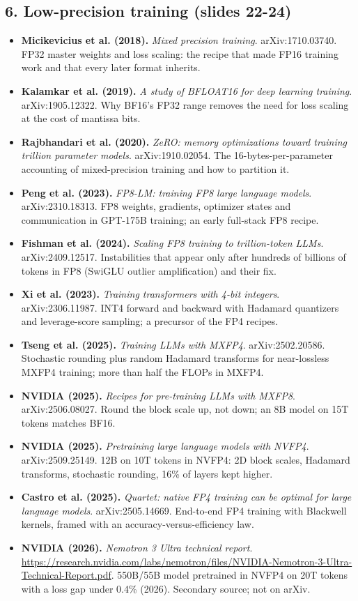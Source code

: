 \documentclass[11pt,letterpaper]{article}
\begin{document}
\subsection*{6. Low-precision training (slides 22-24)}
\begin{itemize}[leftmargin=1.2em,itemsep=3pt]\sloppy
\item \textbf{Micikevicius et al. (2018).} \textit{Mixed precision training}. arXiv:1710.03740. FP32 master weights and loss scaling: the recipe that made FP16 training work and that every later format inherits.
\item \textbf{Kalamkar et al. (2019).} \textit{A study of BFLOAT16 for deep learning training}. arXiv:1905.12322. Why BF16's FP32 range removes the need for loss scaling at the cost of mantissa bits.
\item \textbf{Rajbhandari et al. (2020).} \textit{ZeRO: memory optimizations toward training trillion parameter models}. arXiv:1910.02054. The 16-bytes-per-parameter accounting of mixed-precision training and how to partition it.
\item \textbf{Peng et al. (2023).} \textit{FP8-LM: training FP8 large language models}. arXiv:2310.18313. FP8 weights, gradients, optimizer states and communication in GPT-175B training; an early full-stack FP8 recipe.
\item \textbf{Fishman et al. (2024).} \textit{Scaling FP8 training to trillion-token LLMs}. arXiv:2409.12517. Instabilities that appear only after hundreds of billions of tokens in FP8 (SwiGLU outlier amplification) and their fix.
\item \textbf{Xi et al. (2023).} \textit{Training transformers with 4-bit integers}. arXiv:2306.11987. INT4 forward and backward with Hadamard quantizers and leverage-score sampling; a precursor of the FP4 recipes.
\item \textbf{Tseng et al. (2025).} \textit{Training LLMs with MXFP4}. arXiv:2502.20586. Stochastic rounding plus random Hadamard transforms for near-lossless MXFP4 training; more than half the FLOPs in MXFP4.
\item \textbf{NVIDIA (2025).} \textit{Recipes for pre-training LLMs with MXFP8}. arXiv:2506.08027. Round the block scale up, not down; an 8B model on 15T tokens matches BF16.
\item \textbf{NVIDIA (2025).} \textit{Pretraining large language models with NVFP4}. arXiv:2509.25149. 12B on 10T tokens in NVFP4: 2D block scales, Hadamard transforms, stochastic rounding, 16\% of layers kept higher.
\item \textbf{Castro et al. (2025).} \textit{Quartet: native FP4 training can be optimal for large language models}. arXiv:2505.14669. End-to-end FP4 training with Blackwell kernels, framed with an accuracy-versus-efficiency law.
\item \textbf{NVIDIA (2026).} \textit{Nemotron 3 Ultra technical report}. \url{https://research.nvidia.com/labs/nemotron/files/NVIDIA-Nemotron-3-Ultra-Technical-Report.pdf}. 550B/55B model pretrained in NVFP4 on 20T tokens with a loss gap under 0.4\% (2026). Secondary source; not on arXiv.
\end{itemize}
\end{document}
